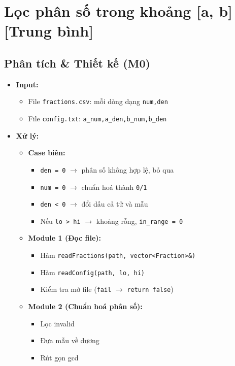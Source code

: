 \section{Lọc phân số trong khoảng [a, b][Trung bình]}
\subsection{Phân tích \& Thiết kế (M0)}
\begin{itemize}
    \item \textbf{Input:}
    \begin{itemize}
        \item File \texttt{fractions.csv}: mỗi dòng dạng \texttt{num,den}
        \item File \texttt{config.txt}: \texttt{a\_num,a\_den,b\_num,b\_den}
    \end{itemize}

    \item \textbf{Xử lý:}
    \begin{itemize}
        \item \textbf{Case biên:}
        \begin{itemize}
            \item \texttt{den = 0} $\rightarrow$ phân số không hợp lệ, bỏ qua
            \item \texttt{num = 0} $\rightarrow$ chuẩn hoá thành \texttt{0/1}
            \item \texttt{den < 0} $\rightarrow$ đổi dấu cả tử và mẫu
            \item Nếu \texttt{lo > hi} $\rightarrow$ khoảng rỗng, \texttt{in\_range = 0}
        \end{itemize}

        \item \textbf{Module 1 (Đọc file):}
        \begin{itemize}
            \item Hàm \texttt{readFractions(path, vector<Fraction>\&)}
            \item Hàm \texttt{readConfig(path, lo, hi)}
            \item Kiểm tra mở file (\texttt{fail} $\rightarrow$ \texttt{return false})
        \end{itemize}

        \item \textbf{Module 2 (Chuẩn hoá phân số):}
        \begin{itemize}
            \item Lọc invalid
            \item Đưa mẫu về dương
            \item Rút gọn gcd
        \end{itemize}


\end{itemize}
\end{itemize}
